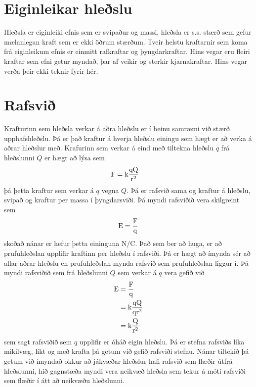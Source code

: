 \section{Eiginleikar hleðslu}
Hleðsla er eiginleiki efnis sem er svipaður og massi, hleðsla er s.s. stærð sem
gefur mælanlegan kraft sem er ekki öðrum stærðum. Tveir helstu kraftarnir sem
koma frá eiginleikum efnis er einmitt rafkraftar og þyngdarkraftar. Hins vegar
eru fleiri kraftar sem efni getur myndað, þar af veikir og sterkir kjarnakraftar.
Hins vegar verða þeir ekki teknir fyrir hér.

\section{Rafsvið}
Krafturinn sem hleðsla verkar á aðra hleðslu er í beinu samræmi við stærð
upphafshleðslu. Þá er það kraftur á hverja hleðslu einingu sem hægt er að
verka á aðrar hleðslur með. Krafurinn sem verkar á eind með tiltekna hleðslu
$q$ frá hleðslunni $Q$ er hægt að lýsa sem
\begin{align*}
	\textrm{F} &=
			\text{k} \frac{\textrm{q} \textrm{Q}}{\textrm{r}^2}
\end{align*} 
þá þetta kraftur sem verkar á $q$ vegna $Q$. Þá er rafsvið sama og kraftur
á hleðslu, svipað og kraftur per massa í þyngdarsviði. Þá myndi rafsviðið
vera skilgreint sem
\begin{align} \label{equ:electric:efield}
	\text{E} = \frac{ \textrm{F} }{ \textrm{q} }
\end{align}
skoðað nánar er hefur þetta eininguna $\si{\N \per \coulomb}$. Það sem ber
að huga, er að prufuhleðslan upplifir kraftinn per hleðslu í rafsviði. Þá
er hægt að ímynda sér að allar aðrar hleðslu en prufuhleðslan mynda rafsvið
sem prufuhleðslan liggur í. Þá myndi rafsviðið sem frá hleðslunni $Q$ sem
verkar á $q$ vera gefið við
\begin{align*}
	\text{E} &= \frac{ \textrm{F} }{ \textrm{q} } \\
		&= \text{k} \frac{\textrm{q} \textrm{Q}}{\textrm{q} \textrm{r}^2} \\
		&= \text{k} \frac{\textrm{Q}}{\textrm{r}^2}
\end{align*}
sem sagt rafsviðið sem $q$ upplifir er óháð eigin hleðslu. Þá er stefna
rafsviðs líka mikilvæg, líkt og með krafta þá getum við gefið rafsviði
stefnu. Nánar tiltekið þá getum við ímyndað okkur að jákvæðar hleðslur
hafi rafsvið sem flæðir útfrá hleðslunni, hið gagnstæða myndi vera neikvæð
hleðsla sem tekur á móti rafsviði sem flæðir í átt að neikvæðu hleðslunni.
